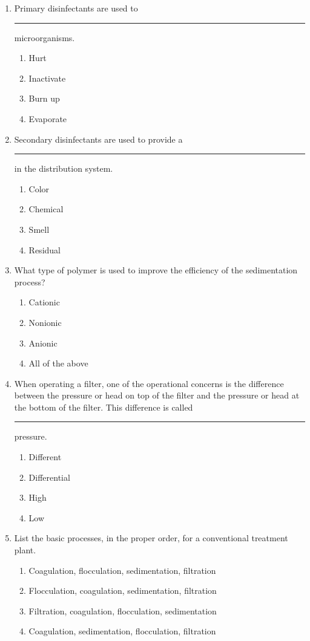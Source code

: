 \documentclass{article}
\begin{document}
\begin{enumerate}
\item Primary disinfectants are used to \rule{1cm}{0.5pt}  microorganisms.
\begin{enumerate}
\item Hurt
\item Inactivate
\item Burn up
\item Evaporate
\end{enumerate}

\item Secondary disinfectants are used to provide a \rule{1cm}{0.5pt}  in the distribution system.
\begin{enumerate}
\item Color
\item Chemical
\item Smell
\item Residual
\end{enumerate}

\item What type of polymer is used to improve the efficiency of the sedimentation
process?
\begin{enumerate}
\item Cationic
\item Nonionic
\item Anionic
\item All of the above
\end{enumerate}

\item When operating a filter, one of the operational concerns is the difference between the pressure or head on top of the filter and the pressure or head at the bottom of the filter. This difference is called \rule{1cm}{0.5pt}  pressure.
\begin{enumerate}
\item Different
\item Differential
\item High
\item Low
\end{enumerate}

\item List the basic processes, in the proper order, for a conventional treatment plant.
\begin{enumerate}
\item Coagulation, flocculation, sedimentation, filtration
\item Flocculation, coagulation, sedimentation, filtration
\item Filtration, coagulation, flocculation, sedimentation
\item Coagulation, sedimentation, flocculation, filtration
\end{enumerate}


\end{enumerate}
\end{document}
